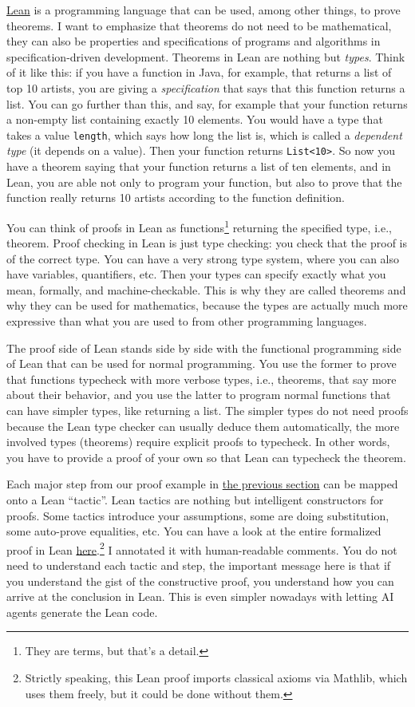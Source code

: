 \documentclass{article}
\begin{document}
\href{https://lean-lang.org}{Lean} is a programming language that can be used, among other things, to prove theorems.
I want to emphasize that theorems do not need to be mathematical, they can also be properties and specifications of programs and algorithms in specification-driven development.
Theorems in Lean are nothing but \emph{types}.
Think of it like this: if you have a function in Java, for example, that returns a list of top 10 artists, you are giving a \emph{specification} that says that this function returns a list.
You can go further than this, and say, for example that your function returns a non-empty list containing exactly 10 elements.
You would have a type that takes a value \texttt{length}, which says how long the list is, which is called a \emph{dependent type} (it depends on a value).
Then your function returns \texttt{List<10>}. So now you have a theorem saying that your function returns a list of ten elements, and in Lean, you are able not only to program your function, but also to prove that the function really returns 10 artists according to the function definition.

You can think of proofs in Lean as functions\footnote{They are terms, but that's a detail.} returning the specified type, i.e., theorem.
Proof checking in Lean is just type checking: you check that the proof is of the correct type.
You can have a very strong type system, where you can also have variables, quantifiers, etc.
Then your types can specify exactly what you mean, formally, and machine-checkable.
This is why they are called theorems and why they can be used for mathematics, because the types are actually much more expressive than what you are used to from other programming languages.

The proof side of Lean stands side by side with the functional programming side of Lean that can be used for normal programming.
You use the former to prove that functions typecheck with more verbose types, i.e., theorems, that say more about their behavior, and you use the latter to program normal functions that can have simpler types, like returning a list.
The simpler types do not need proofs because the Lean type checker can usually deduce them automatically, the more involved types (theorems) require explicit proofs to typecheck.
In other words, you have to provide a proof of your own so that Lean can typecheck the theorem.

Each major step from our proof example in \protect\hyperlink{negation}{the previous section} can be mapped onto a Lean ``tactic''.
Lean tactics are nothing but intelligent constructors for proofs. 
Some tactics introduce your assumptions, some are doing substitution, some auto-prove equalities, etc.
You can have a look at the entire formalized proof in Lean \href{/files/theorem.lean}{here}.\footnote{Strictly speaking, this Lean proof imports classical axioms via Mathlib, which uses them freely, but it could be done without them.}
I annotated it with human-readable comments.
You do not need to understand each tactic and step, the important message here is that if you understand the gist of the constructive proof, you understand how you can arrive at the conclusion in Lean.
This is even simpler nowadays with letting AI agents generate the Lean code.
\end{document}
